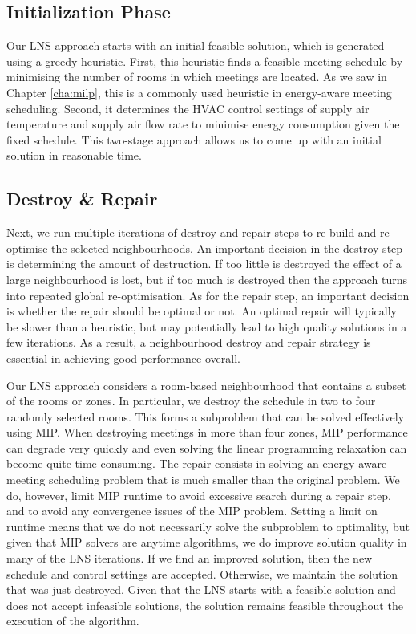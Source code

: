 \subsection{Initialization Phase}\label{sec:lns_init}

Our LNS approach starts with an initial feasible solution, which is generated using a greedy heuristic. First, this heuristic finds a feasible meeting schedule by minimising the number of rooms in which meetings are located. As we saw in Chapter \ref{cha:milp}, this is a commonly used heuristic in energy-aware meeting scheduling. Second, it determines the HVAC control settings of supply air temperature and supply air flow rate to minimise energy consumption given the fixed schedule. This two-stage approach allows us to come up with an initial solution in reasonable time.


\subsection{Destroy \& Repair}\label{sec:lns_dr}

Next, we run multiple iterations of destroy and repair steps to re-build and re-optimise the selected neighbourhoods. An important decision in the destroy step is determining the amount of destruction. If too little is destroyed the effect of a large neighbourhood is lost, but if too much is destroyed then the approach turns into repeated global re-optimisation. As for the repair step, an important decision is whether the repair should be optimal or not. An optimal repair will typically be slower than a heuristic, but may potentially lead to high quality solutions in a few iterations. As a result, a neighbourhood destroy and repair strategy is essential in achieving good performance overall.

Our LNS approach considers a room-based neighbourhood that contains a subset of the rooms or zones. In particular, we destroy the schedule in two to four randomly selected rooms. This forms a subproblem that can be solved effectively using MIP. When destroying meetings in more than four zones, MIP performance can degrade very quickly and even solving the linear programming relaxation can become quite time consuming. The repair consists in solving an energy aware meeting scheduling problem that is much smaller than the original problem. We do, however, limit MIP runtime to avoid excessive search during a repair step, and to avoid any convergence issues of the MIP problem. Setting a limit on runtime means that we do not necessarily solve the subproblem to optimality, but given that MIP solvers are anytime algorithms, we do improve solution quality in many of the LNS iterations. If we find an improved solution, then the new schedule and control settings are accepted. Otherwise, we maintain the solution that was just destroyed. Given that the LNS starts with a feasible solution and does not accept infeasible solutions, the solution remains feasible throughout the execution of the algorithm.

